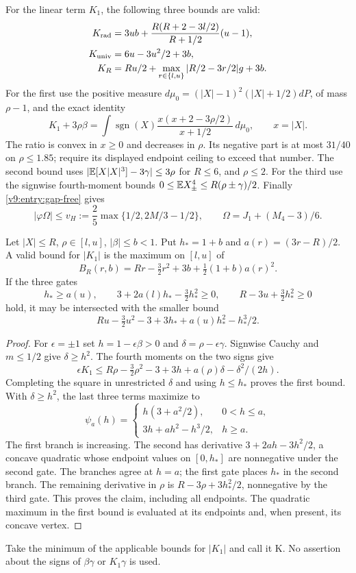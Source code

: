 For the linear term $K_1$, the following three bounds are valid:
\begin{align*}
 K_{\rm rad}&=3ub+\frac{R(R+2-3l/2)}{R+1/2}(u-1),\\
 K_{\rm univ}&=6u-3u^2/2+3b,\\
 K_R&=Ru/2+\max_{r\in\{l,u\}}|R/2-3r/2|g+3b.
\end{align*}
For the first use the positive measure
$d\mu_0=(|X|-1)^2(|X|+1/2)dP$, of mass $\rho-1$, and the exact identity
\[
 K_1+3\rho\beta=
 \int\operatorname{sgn}(X)\frac{x(x+2-3\rho/2)}{x+1/2}\,d\mu_0,
 \qquad x=|X|.
\]
The ratio is convex in $x\ge0$ and decreases in $\rho$. Its negative
part is at most $31/40$ on $\rho\le1.85$; require its displayed
endpoint ceiling to exceed that number. The second bound uses
$|\mathbb E[X|X|^3]-3\gamma|\le3\rho$ for $R\le6$, and $\rho\le2$.
For the third use the signwise fourth-moment bounds
$0\le\mathbb E X_\pm^4\le R(\rho\pm\gamma)/2$.
Finally \eqref{v9:entry:gap-free} gives
\[
 |\varphi\Omega|\le v_H:=\frac25\max\{1/2,2M/3-1/2\},
 \qquad\Omega=J_1+(M_4-3)/6.
\]

\begin{lemma}\label{v9:entry:signed-K}
Let $|X|\le R$, $\rho\in[l,u]$, $|\beta|\le b<1$.
Put $h_*=1+b$ and $a(r)=(3r-R)/2$.
A valid bound for $|K_1|$ is the maximum on $[l,u]$ of
\[
 B_R(r,b)=Rr-\tfrac32r^2+3b+\tfrac12(1+b)a(r)^2.
\]
If the three gates
\[
 h_*\ge a(u),\qquad 3+2a(l)h_*-\tfrac32h_*^2\ge0,
 \qquad R-3u+\tfrac32h_*^2\ge0
\]
hold, it may be intersected with the smaller bound
\[
 Ru-\tfrac32u^2-3+3h_*+a(u)h_*^2-h_*^3/2.
\]
\end{lemma}
\begin{proof}
For $\epsilon=\pm1$ set $h=1-\epsilon\beta>0$ and
$\delta=\rho-\epsilon\gamma$. Signwise Cauchy and $m\le1/2$ give
$\delta\ge h^2$. The fourth moments on the two signs give
\[
 \epsilon K_1\le R\rho-\tfrac32\rho^2-3
                    +3h+a(\rho)\delta-\delta^2/(2h).
\]
Completing the square in unrestricted $\delta$ and using $h\le h_*$
proves the first bound. With $\delta\ge h^2$, the last three terms
maximize to
\[
 \psi_a(h)=
 \begin{cases}h(3+a^2/2),&0<h\le a,\\
                3h+ah^2-h^3/2,&h\ge a.
 \end{cases}
\]
The first branch is increasing. The second has derivative
$3+2ah-3h^2/2$, a concave quadratic whose endpoint values on
$[0,h_*]$ are nonnegative under the second gate. The branches agree
at $h=a$; the first gate places $h_*$ in the second branch. The
remaining derivative in $\rho$ is $R-3\rho+3h_*^2/2$, nonnegative
by the third gate. This proves the claim, including all endpoints.
The quadratic maximum in the first bound is evaluated at its endpoints
and, when present, its concave vertex.
\end{proof}
Take the minimum of the applicable bounds for $|K_1|$ and call it K.
No assertion about the signs of $\beta\gamma$ or $K_1\gamma$ is used.

